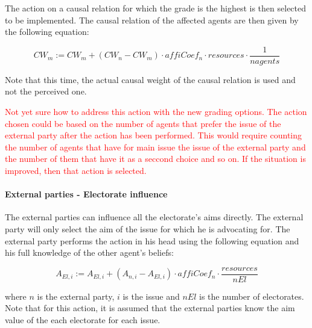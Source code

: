 The action on a causal relation for which the grade is the highest is then selected to be implemented. The causal relation of the affected agents are then given by the following equation:

\begin{equation}
CW_{m} := CW_{m} + \left(CW_{n} - CW_{m} \right) \cdot affiCoef_n \cdot resources \cdot \frac{1}{nagents}
\end{equation}

Note that this time, the actual causal weight of the causal relation is used and not the perceived one.

\textcolor{red}{Not yet sure how to address this action with the new grading options. The action chosen could be based on the number of agents that prefer the issue of the external party after the action has been performed. This would require counting the number of agents that have for main issue the issue of the external party and the number of them that have it as a seccond choice and so on. If the situation is improved, then that action is selected.}


\paragraph{External parties - Electorate influence}

The external parties can influence all the electorate's aims directly. The external party will only select the aim of the issue for which he is advocating for. The external party performs the action in his head using the following equation and his full knowledge of the other agent's beliefs:

\begin{equation}
A_{El, i} := A_{El, i} + \left(A_{n, i} - A_{El, i} \right) \cdot affiCoef_n \cdot \frac{resources}{nEl}
\end{equation}

where $n$ is the external party, $i$ is the issue and $nEl$ is the number of electorates. Note that for this action, it is assumed that the external parties know the aim value of the each electorate for each issue.

